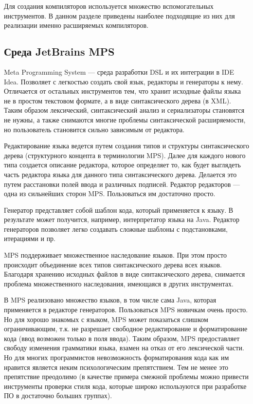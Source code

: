 \documentclass[a4paper,12pt,titlepage]{extarticle}
\begin{document}
Для создания компиляторов используется множество вспомогательных инструментов. В
данном разделе приведены наиболее подходящие из них для реализации
именно расширяемых компиляторов. 

\subsection{Среда JetBrains MPS}
Meta Programming System --- среда разработки DSL и их интеграции в IDE Idea.
Позволяет с легкостью создать свой язык, редакторы и генераторы к нему.
Отличается от остальных инструментов тем, что хранит исходные файлы языка не в
простом текстовом формате, а в виде синтаксического дерева (в XML).
Таким образом лексический, синтаксический анализ и сериализаторы
становятся не нужны, а также снимаются многие проблемы синтаксической
расширяемости, но пользователь становится сильно зависимым от редактора.

Редактирование языка ведется путем создания типов и структуры синтаксического
дерева (структурного концепта в терминологии MPS). Далее для каждого нового типа
создается описание редактора, которое определяет то, как будет выглядеть часть
редактора языка для данного типа синтаксического дерева. Делается это путем
расстановки полей ввода и различных подписей. Редактор редакторов --- одна из
сильнейших сторон MPS. Пользоваться им достаточно просто.

Генератор представляет собой шаблон кода, который применяется к языку. В
результате может получится, например, интерпретатор языка на Java. Редактор
генераторов позволяет легко создавать сложные шаблоны с подстановками,
итерациями и пр.

MPS поддерживает множественное наследование языков. При этом просто происходит 
объединение всех типов синтаксического дерева всех языков. Благодаря хранению
исходных файлов в виде синтаксического дерева, снимается проблема
множественного наследования, имеющаяся в других инструментах.

В MPS реализовано множество языков, в том числе сама Java, которая применяется
в редакторе генераторов. Пользоваться MPS новичкам очень просто. Но для хорошо
знакомых с языком, MPS может показаться слишком ограничивающим, т.к. не
разрешает свободное редактирование и форматирование кода (ввод возможен только в
поля ввода). Таким образом, MPS предоставляет свободу изменения грамматики
языка, взамен на отказ от его лексической части. Но для многих программистов
невозможность форматирования кода как им нравится является неким психологическим
препятствием. Тем не менее это препятствие преодолимо (в качестве примера
смежной проблемы можно привести инструменты проверки стиля кода, которые широко
используются при разработке ПО в достаточно больших группах).
\end{document}
